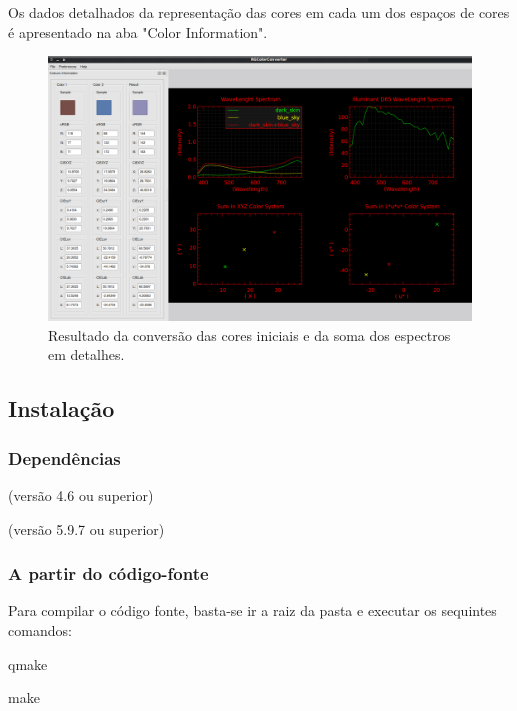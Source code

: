 \par
Os dados detalhados da representação das cores em cada um dos espaços de cores
é apresentado na aba "Color Information".

\begin{figure}[!htb]
     \centering
     \includegraphics[scale=0.6]{img/screenshot_RGColorConverter_details.png}
     \caption{Resultado da conversão das cores iniciais e da soma dos
espectros em detalhes.}
     \label{fig:screenshot_details}
\end{figure}

\subsection{Instalação}

\subsubsection{Dependências}
\begin{list}{}{}
\item {} (versão 4.6 ou superior)
\item {} (versão 5.9.7
ou superior)
\end{list}

\subsubsection{A partir do código-fonte}
\par
Para compilar o código fonte, basta-se ir a raiz da pasta e executar os
sequintes comandos:

\begin{list}{}{}
\item qmake
\item make
\end{list}

